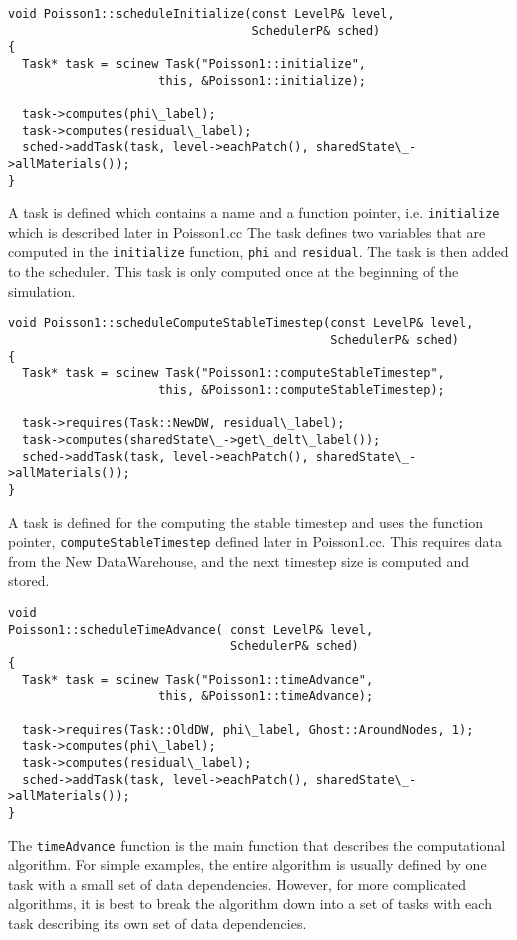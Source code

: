 \documentclass[12pt]{report}
\begin{document}
\begin{verbatim}
void Poisson1::scheduleInitialize(const LevelP& level,
                                  SchedulerP& sched)
{
  Task* task = scinew Task("Poisson1::initialize",
                     this, &Poisson1::initialize);

  task->computes(phi\_label);
  task->computes(residual\_label);
  sched->addTask(task, level->eachPatch(), sharedState\_->allMaterials());
}
\end{verbatim}

A task is defined which contains a name and a function pointer,
i.e. \texttt{initialize} which is described later in Poisson1.cc The
task defines two variables that are computed in the
\texttt{initialize} function, \texttt{phi} and \texttt{residual}.  The
task is then added to the scheduler.  This task is only computed once
at the beginning of the simulation.

\begin{verbatim}
void Poisson1::scheduleComputeStableTimestep(const LevelP& level,
                                             SchedulerP& sched)
{
  Task* task = scinew Task("Poisson1::computeStableTimestep",
                     this, &Poisson1::computeStableTimestep);

  task->requires(Task::NewDW, residual\_label);
  task->computes(sharedState\_->get\_delt\_label());
  sched->addTask(task, level->eachPatch(), sharedState\_->allMaterials());
}

\end{verbatim}

A task is defined for the computing the stable timestep and uses the
function pointer, \texttt{computeStableTimestep} defined later in
Poisson1.cc.  This requires data from the New DataWarehouse, and the
next timestep size is computed and stored.

\begin{verbatim}
void
Poisson1::scheduleTimeAdvance( const LevelP& level,
                               SchedulerP& sched)
{
  Task* task = scinew Task("Poisson1::timeAdvance",
                     this, &Poisson1::timeAdvance);

  task->requires(Task::OldDW, phi\_label, Ghost::AroundNodes, 1);
  task->computes(phi\_label);
  task->computes(residual\_label);
  sched->addTask(task, level->eachPatch(), sharedState\_->allMaterials());
}
\end{verbatim}

The \texttt{timeAdvance} function is the main function that describes
the computational algorithm.  For simple examples, the entire
algorithm is usually defined by one task with a small set of data
dependencies.  However, for more complicated algorithms, it is best to
break the algorithm down into a set of tasks with each task describing
its own set of data dependencies.
\end{document}
